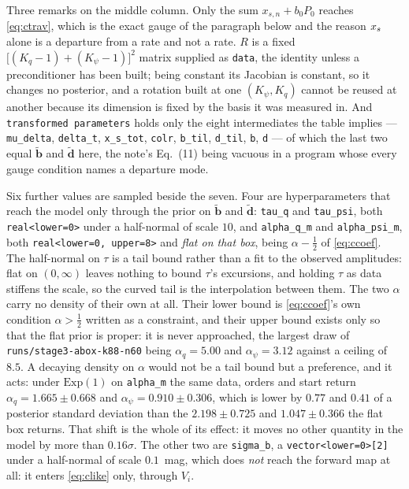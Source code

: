 \documentclass[11pt]{article}
\newcommand{\file}[1]{\texttt{#1}}
\newcommand{\code}[1]{\texttt{#1}}
\begin{document}
\medskip\noindent
Three remarks on the middle column. Only the sum $x_{s,n} + b_{0}P_{0}$ reaches
\eqref{eq:ctrav}, which is the exact gauge of the paragraph below and the reason $x_{s}$
alone is a departure from a rate and not a rate. $R$ is a fixed
$\bigl[(K_{q}{-}1)+(K_{\psi}{-}1)\bigr]^{2}$ matrix supplied as \code{data}, the identity
unless a preconditioner has been built; being constant its Jacobian is constant, so it
changes no posterior, and a rotation built at one $(K_{\psi}, K_{q})$ cannot be reused at
another because its dimension is fixed by the basis it was measured in. And
\code{transformed parameters} holds only the eight intermediates the table implies ---
\code{mu\_delta}, \code{delta\_t}, \code{x\_s\_tot}, \code{colr}, \code{b\_til},
\code{d\_til}, \code{b}, \code{d} --- of which
the last two equal $\tilde{\mathbf{b}}$ and $\tilde{\mathbf{d}}$ here, the note's Eq.~(11)
being vacuous in a program whose every gauge condition names a departure mode.

\medskip\noindent
Six further values are sampled beside the seven. Four are hyperparameters that reach the
model only through the prior on $\tilde{\mathbf{b}}$ and $\tilde{\mathbf{d}}$:
\code{tau\_q} and \code{tau\_psi}, both \code{real<lower=0>} under a half-normal of scale
$10$, and \code{alpha\_q\_m} and \code{alpha\_psi\_m}, both
\code{real<lower=0, upper=8>} and \emph{flat on that box}, being $\alpha - \frac12$ of
\eqref{eq:ccoef}. The half-normal on $\tau$
is a tail bound rather than a fit to the observed amplitudes: flat on $(0,\infty)$ leaves
nothing to bound $\tau$'s excursions, and holding $\tau$ as data stiffens the scale, so the
curved tail is the interpolation between them. The two $\alpha$ carry no density of their
own at all. Their lower bound is \eqref{eq:ccoef}'s own condition $\alpha > \tfrac12$
written as a constraint, and their upper bound exists only so that the flat prior is
proper: it is never approached, the largest draw of \file{runs/stage3-abox-k88-n60} being
$\alpha_{q} = 5.00$ and $\alpha_{\psi} = 3.12$ against a ceiling of $8.5$. A decaying
density on $\alpha$ would not be a tail bound but a preference, and it acts: under
$\mathrm{Exp}(1)$ on \code{alpha\_m} the same data, orders and start return
$\alpha_{q} = 1.665 \pm 0.668$ and $\alpha_{\psi} = 0.910 \pm 0.306$, which is lower by
$0.77$ and $0.41$ of a posterior standard deviation than the $2.198 \pm 0.725$ and
$1.047 \pm 0.366$ the flat box returns. That shift is the whole of its effect: it moves no
other quantity in the model by more than $0.16\sigma$. The other two are \code{sigma\_b}, a
\code{vector<lower=0>[2]} under a half-normal of scale $0.1$~mag, which does \emph{not}
reach the forward map at all: it enters \eqref{eq:clike} only, through $V_{i}$.
\end{document}
